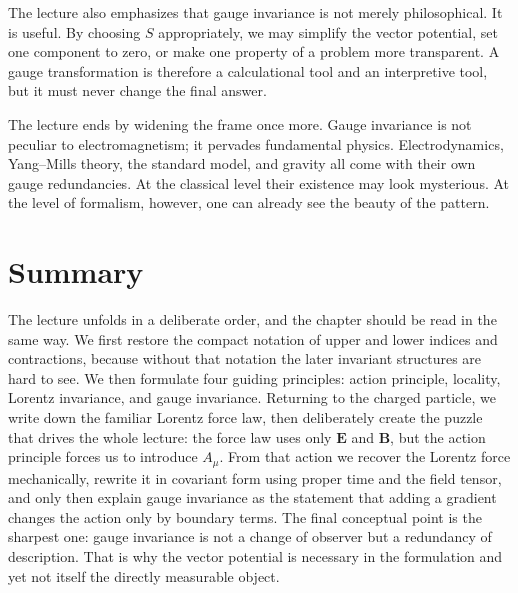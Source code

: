 The lecture also emphasizes that gauge invariance is not merely philosophical. It is useful. By choosing \(S\) appropriately, we may simplify the vector potential, set one component to zero, or make one property of a problem more transparent. A gauge transformation is therefore a calculational tool and an interpretive tool, but it must never change the final answer.

The lecture ends by widening the frame once more. Gauge invariance is not peculiar to electromagnetism; it pervades fundamental physics. Electrodynamics, Yang--Mills theory, the standard model, and gravity all come with their own gauge redundancies. At the classical level their existence may look mysterious. At the level of formalism, however, one can already see the beauty of the pattern.

\section{Summary}

The lecture unfolds in a deliberate order, and the chapter should be read in the same way. We first restore the compact notation of upper and lower indices and contractions, because without that notation the later invariant structures are hard to see. We then formulate four guiding principles: action principle, locality, Lorentz invariance, and gauge invariance. Returning to the charged particle, we write down the familiar Lorentz force law, then deliberately create the puzzle that drives the whole lecture: the force law uses only \(\mathbf E\) and \(\mathbf B\), but the action principle forces us to introduce \(A_\mu\). From that action we recover the Lorentz force mechanically, rewrite it in covariant form using proper time and the field tensor, and only then explain gauge invariance as the statement that adding a gradient changes the action only by boundary terms. The final conceptual point is the sharpest one: gauge invariance is not a change of observer but a redundancy of description. That is why the vector potential is necessary in the formulation and yet not itself the directly measurable object.